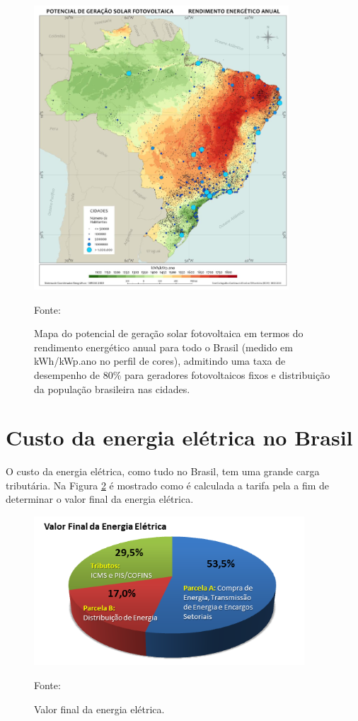 \begin{figure}[H]
    \centering
    \includegraphics[width=0.85\textwidth]{./Figuras/pot_geracao_solar.png}
    \caption{Mapa do potencial de geração solar fotovoltaica em termos do rendimento energético anual para todo o Brasil (medido em kWh/kWp.ano no perfil de cores), admitindo uma taxa de desempenho de 80\% para geradores fotovoltaicos fixos e distribuição da população brasileira nas cidades.}{Fonte: \cite{atlas2017}}
   \label{fig:pot_geracao_solar}
\end{figure}

\section{Custo da energia elétrica no Brasil}

O custo da energia elétrica, como tudo no Brasil, tem uma grande carga tributária. Na Figura \ref{fig:valor_tarifa} é mostrado como é calculada a tarifa pela \cite{ANEEL_TARIFA} a fim de determinar o valor final da energia elétrica.

\begin{figure}[H]
    \centering
    \includegraphics[width=0.9\textwidth]{./Figuras/valor_tarifa.png}
    \caption{Valor final da energia elétrica.}{Fonte: \cite{ANEEL_TARIFA}}
   \label{fig:valor_tarifa}
\end{figure}

